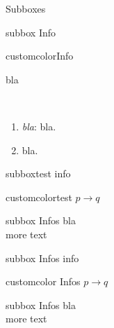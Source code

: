 \documentclass[10pt,a4paper]{article}
\begin{document}
\begin{multicols}{3}
\begin{textbox}{Subboxes}
\begin{multibox}{2}
\begin{subbox}{subbox}{ Info}
\end{subbox}
\begin{subbox}{customcolor}{Info}

\end{subbox}
\end{multibox}
\end{textbox}



\begin{textbox}{bla}


\\
\begin{enumerate}
    \item \emph{bla}: bla.
    \item bla.
\end{enumerate}

\begin{multibox}{3} %
\begin{subbox}{subbox}{test}
info
\end{subbox}
\begin{subbox}{customcolor}{test}
$p \to q$
\end{subbox}
\begin{subbox}{subbox}{ Infos}
bla \\
more text
\end{subbox}
\end{multibox}

\begin{multibox}{3} %
\begin{subbox}{subbox}{ Infos}
info
\end{subbox}
\begin{subbox}{customcolor}{ Infos}
$p \to q$
\end{subbox}
\begin{subbox}{subbox}{ Infos}
bla \\
more text
\end{subbox}
\end{multibox}

\end{textbox}


\AtNextBibliography{\footnotesize}
\printbibliography  
\end{multicols}
\end{document}
